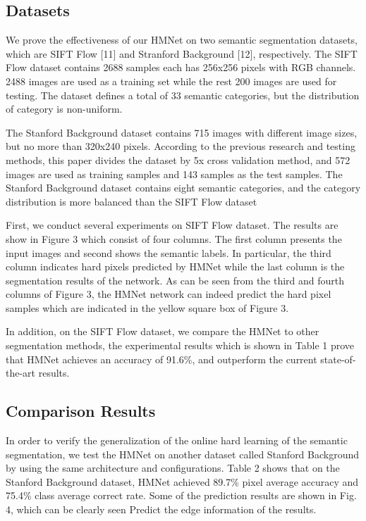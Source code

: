 \documentclass[10.5pt,compsoc]{TsT}
\theoremstyle{mystyle}
\begin{document}
{\subsection{Datasets}
\noindent
We prove the effectiveness of our HMNet on two semantic segmentation datasets, which are SIFT Flow [11] and Stranford Background [12], respectively. The SIFT Flow dataset contains 2688 samples each has 256x256 pixels with RGB channels. 2488 images are used as a training set while the rest 200 images are used for testing. The dataset defines a total of 33 semantic categories, but the distribution of category is non-uniform.

The Stanford Background dataset contains 715 images with different image sizes, but no more than 320x240 pixels. According to the previous research and testing methods, this paper divides the dataset by 5x cross validation method, and 572 images are used as training samples and 143 samples as the test samples. The Stanford Background dataset contains eight semantic categories, and the category distribution is more balanced than the SIFT Flow dataset

First, we conduct several experiments on SIFT Flow dataset. The results are show in Figure 3 which consist of four columns. The first column presents the input images and second shows the semantic labels. In particular, the third column indicates hard pixels predicted by HMNet while the last column is the segmentation results of the network. As can be seen from the third and fourth columns of Figure 3, the HMNet network can indeed predict the hard pixel samples which are indicated in the yellow square box of Figure 3.

In addition, on the SIFT Flow dataset, we compare the HMNet to other segmentation methods, the experimental results which is shown in Table 1 prove that HMNet achieves an accuracy of 91.6\%, and outperform the current state-of-the-art results.

\subsection{Comparison Results}
\noindent
In order to verify the generalization of the online hard learning of the semantic segmentation, we test the HMNet on another dataset called Stanford Background by using the same architecture and configurations. Table 2 shows that on the Stanford Background dataset, HMNet achieved 89.7\% pixel average accuracy and 75.4\% class average correct rate. Some of the prediction results are shown in Fig. 4, which can be clearly seen Predict the edge information of the results.

}
\end{document}
